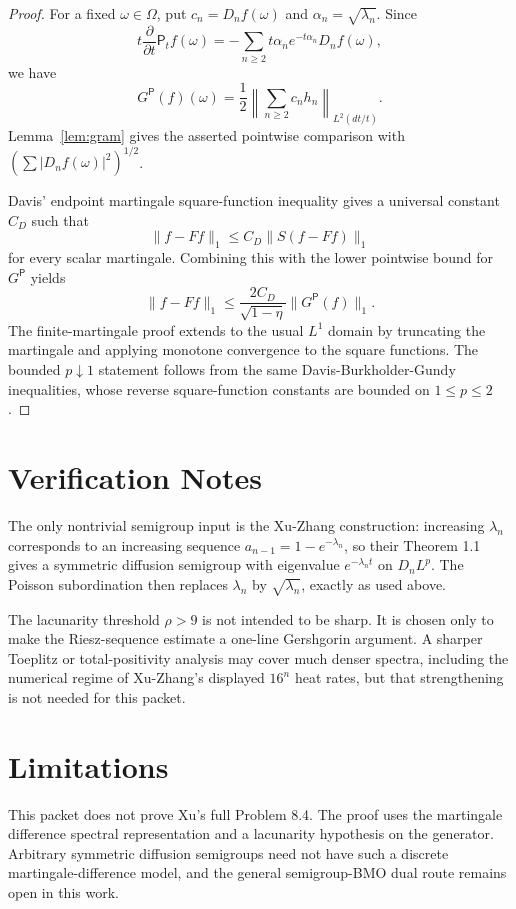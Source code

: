 \documentclass[11pt]{article}
\newcommand{\sfP}{\mathsf P}
\begin{document}
\begin{proof}
For a fixed \(\omega\in\Omega\), put \(c_n=D_n f(\omega)\) and
\(\alpha_n=\sqrt{\lambda_n}\).  Since
\[
  t\frac{\partial}{\partial t}\sfP_t f(\omega)
  =-\sum_{n\ge2}t\alpha_n e^{-t\alpha_n}D_n f(\omega),
\]
we have
\[
  G^{\sfP}(f)(\omega)
  =\frac12\left\|\sum_{n\ge2}c_n h_n\right\|_{L^2(dt/t)} .
\]
Lemma~\ref{lem:gram} gives the asserted pointwise comparison with
\((\sum |D_n f(\omega)|^2)^{1/2}\).

Davis' endpoint martingale square-function inequality gives a universal
constant \(C_D\) such that
\[
  \|f-Ff\|_1\le C_D\|S(f-Ff)\|_1
\]
for every scalar martingale.  Combining this with the lower pointwise bound
for \(G^{\sfP}\) yields
\[
  \|f-Ff\|_1
  \le \frac{2C_D}{\sqrt{1-\eta}}\|G^{\sfP}(f)\|_1 .
\]
The finite-martingale proof extends to the usual \(L^1\) domain by truncating
the martingale and applying monotone convergence to the square functions.
The bounded \(p\downarrow1\) statement follows from the same
Davis-Burkholder-Gundy inequalities, whose reverse square-function constants
are bounded on \(1\le p\le2\).
\end{proof}

\section*{Verification Notes}

The only nontrivial semigroup input is the Xu-Zhang construction: increasing
\(\lambda_n\) corresponds to an increasing sequence
\(a_{n-1}=1-e^{-\lambda_n}\), so their Theorem 1.1 gives a symmetric diffusion
semigroup with eigenvalue \(e^{-\lambda_n t}\) on \(D_nL^p\).  The Poisson
subordination then replaces \(\lambda_n\) by \(\sqrt{\lambda_n}\), exactly as
used above.

The lacunarity threshold \(\rho>9\) is not intended to be sharp.  It is chosen
only to make the Riesz-sequence estimate a one-line Gershgorin argument.
A sharper Toeplitz or total-positivity analysis may cover much denser spectra,
including the numerical regime of Xu-Zhang's displayed \(16^n\) heat rates, but
that strengthening is not needed for this packet.

\section*{Limitations}

This packet does not prove Xu's full Problem 8.4.  The proof uses the
martingale difference spectral representation and a lacunarity hypothesis on
the generator.  Arbitrary symmetric diffusion semigroups need not have such a
discrete martingale-difference model, and the general semigroup-BMO dual route
remains open in this work.
\end{document}

